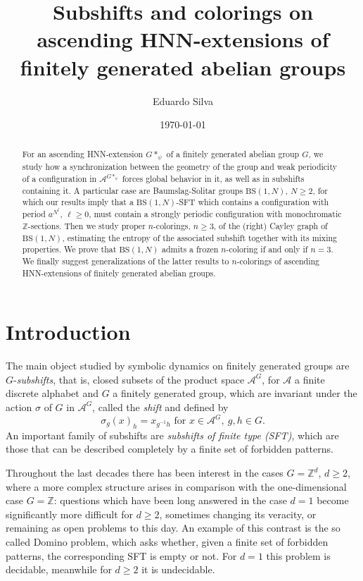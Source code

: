 \documentclass[letterpaper,11pt,reqno]{amsart}
\title{Subshifts and colorings on ascending HNN-extensions of finitely generated abelian groups}
\date{\today}
\author{Eduardo Silva}
\theoremstyle{plain}
\theoremstyle{definition}
\theoremstyle{cupremark}
\newcommand{\BS}[1][N]{\mathrm{BS}(1,#1)}
\begin{document}
	


\begin{abstract}
For an ascending HNN-extension $G*_{\psi}$ of a finitely generated abelian group $G$, we study how a synchronization between the geometry of the group and weak periodicity of a configuration in $\mathcal{A}^{G*_{\psi}}$ forces global behavior in it, as well as in subshifts containing it. A particular case are Baumslag-Solitar groups $\BS$, $N\ge2$, for which our results imply that a $\BS$-SFT which contains a configuration with period $a^{N^\ell}$, $\ell\ge 0$, must contain a strongly periodic configuration with monochromatic $\mathbb{Z}$-sections. Then we study proper $n$-colorings, $n\ge 3$, of the (right) Cayley graph of $\BS$, estimating the entropy of the associated subshift together with its mixing properties. We prove that $\BS$ admits a frozen $n$-coloring if and only if $n=3$. We finally suggest generalizations of the latter results to $n$-colorings of ascending HNN-extensions of finitely generated abelian groups.
\end{abstract}	
\maketitle 	



\section{Introduction}
\label{section:introduction}
The main object studied by symbolic dynamics on finitely generated groups are $G$-\textit{subshifts}, that is, closed subsets of the product space $\mathcal{A}^G$, for $\mathcal{A}$ a finite discrete alphabet and $G$ a finitely generated group, which are invariant under the action $\sigma$ of $G$ in $\mathcal{A}^G$, called the \textit{shift} and defined by
$$\sigma_g(x)_h=x_{g^{-1}h}\text{ for }x\in\mathcal{A}^G,\ g,h\in G.$$
An important family of subshifts are \textit{subshifts of finite type (SFT)}, which are those that can be described completely by a finite set of forbidden patterns.

Throughout the last decades there has been interest in the cases $G=\mathbb{Z}^d$, $d\ge 2$, where a more complex structure arises in comparison with the one-dimensional case $G=\mathbb{Z}$: questions which have been long answered in the case $d=1$ become significantly more difficult for $d\ge 2$, sometimes changing its veracity, or remaining as open problems to this day. An example of this contrast is the so called Domino problem, which asks whether, given a finite set of forbidden patterns, the corresponding SFT is empty or not. For $d=1$ this problem is decidable, meanwhile for $d\ge 2$ it is undecidable.
\end{document}
